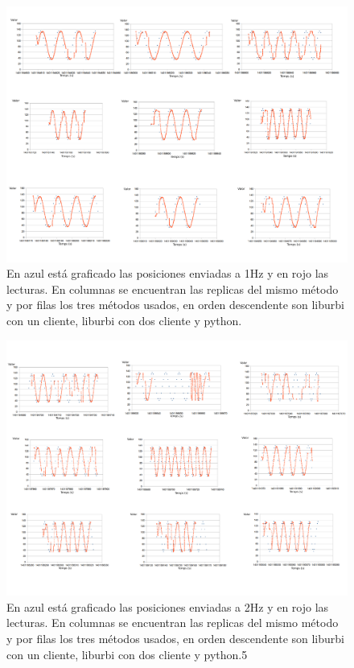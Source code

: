 \documentclass[12pt,a4paper,final,twoside]{article}
\begin{document}
\begin{figure}[H]
	\centering
    \includegraphics[scale=0.37]{images/sin1H.pdf}
	 \caption{En azul está graficado las posiciones enviadas a 1Hz y en rojo las lecturas. En columnas se encuentran las replicas del mismo método y por filas los tres métodos usados, en orden descendente son liburbi con un cliente, liburbi con dos cliente y python.}
  \label{fig:sin1H}
\end{figure}
\begin{figure}[H]
	\centering
    \includegraphics[scale=0.37]{images/sin2H.pdf}
	 \caption{En azul está graficado las posiciones enviadas a 2Hz y en rojo las lecturas. En columnas se encuentran las replicas del mismo método y por filas los tres métodos usados, en orden descendente son liburbi con un cliente, liburbi con dos cliente y python.5}
  \label{fig:sin2H}
\end{figure}
\end{document}
